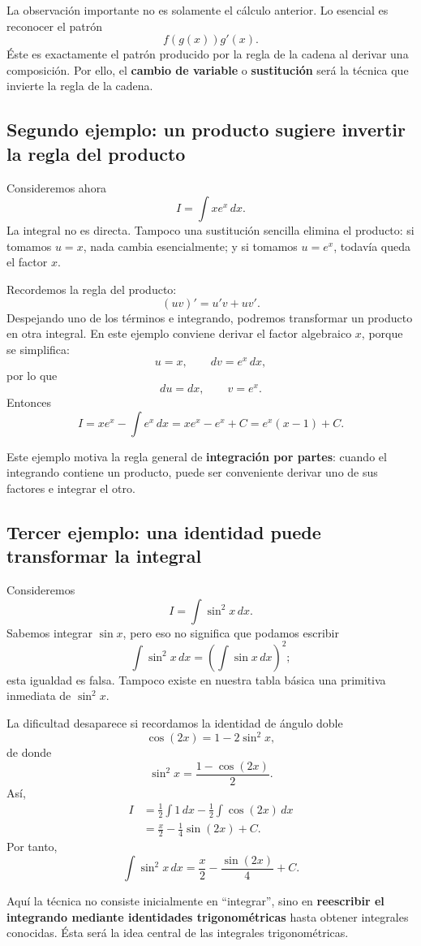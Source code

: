 \documentclass[12pt]{article}
\theoremstyle{definition}
\theoremstyle{remark}
\begin{document}
La observación importante no es solamente el cálculo anterior. Lo esencial es reconocer el patrón
\[
\boxed{f(g(x))g'(x)}.
\]
Éste es exactamente el patrón producido por la regla de la cadena al derivar una composición. Por ello, el \textbf{cambio de variable} o \textbf{sustitución} será la técnica que invierte la regla de la cadena.

\subsection*{Segundo ejemplo: un producto sugiere invertir la regla del producto}
Consideremos ahora
\[
I=\int xe^x\,dx.
\]
La integral no es directa. Tampoco una sustitución sencilla elimina el producto: si tomamos $u=x$, nada cambia esencialmente; y si tomamos $u=e^x$, todavía queda el factor $x$.

Recordemos la regla del producto:
\[
(uv)'=u'v+uv'.
\]
Despejando uno de los términos e integrando, podremos transformar un producto en otra integral. En este ejemplo conviene derivar el factor algebraico $x$, porque se simplifica:
\[
u=x,\qquad dv=e^x\,dx,
\]
por lo que
\[
du=dx,\qquad v=e^x.
\]
Entonces
\[
I=xe^x-\int e^x\,dx
=xe^x-e^x+C
=\boxed{e^x(x-1)+C}.
\]

Este ejemplo motiva la regla general de \textbf{integración por partes}: cuando el integrando contiene un producto, puede ser conveniente derivar uno de sus factores e integrar el otro.

\subsection*{Tercer ejemplo: una identidad puede transformar la integral}
Consideremos
\[
I=\int\sin^2x\,dx.
\]
Sabemos integrar $\sin x$, pero eso no significa que podamos escribir
\[
\int\sin^2x\,dx=(\int\sin x\,dx)^2;
\]
esta igualdad es falsa. Tampoco existe en nuestra tabla básica una primitiva inmediata de $\sin^2x$.

La dificultad desaparece si recordamos la identidad de ángulo doble
\[
\cos(2x)=1-2\sin^2x,
\]
de donde
\[
\sin^2x=\frac{1-\cos(2x)}{2}.
\]
Así,
\begin{align*}
I&=\frac12\int1\,dx-\frac12\int\cos(2x)\,dx\\
&=\frac{x}{2}-\frac14\sin(2x)+C.
\end{align*}
Por tanto,
\[
\boxed{\int\sin^2x\,dx=\frac{x}{2}-\frac{\sin(2x)}{4}+C}.
\]

Aquí la técnica no consiste inicialmente en ``integrar'', sino en \textbf{reescribir el integrando mediante identidades trigonométricas} hasta obtener integrales conocidas. Ésta será la idea central de las integrales trigonométricas.
\end{document}
